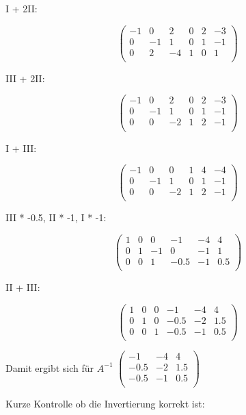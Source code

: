 \documentclass{article}
\begin{document}
I + 2II:

\[
\left (
\begin{array}{ccc|ccc}
  -1 & 0 & 2 & 0 & 2 & -3 \\
  0 & -1 & 1 & 0 & 1 & -1 \\
  0 & 2 & -4 & 1 & 0 & 1 \\
\end{array}
\right )
\]

III + 2II:

\[
\left (
\begin{array}{ccc|ccc}
  -1 & 0 & 2 & 0 & 2 & -3 \\
  0 & -1 & 1 & 0 & 1 & -1 \\
  0 & 0 & -2 & 1 & 2 & -1 \\
\end{array}
\right )
\]

I + III:

\[
\left (
\begin{array}{ccc|ccc}
  -1 & 0 & 0 & 1 & 4 & -4 \\
  0 & -1 & 1 & 0 & 1 & -1 \\
  0 & 0 & -2 & 1 & 2 & -1 \\
\end{array}
\right )
\]

III * -0.5, II * -1, I * -1:

\[
\left (
\begin{array}{ccc|ccc}
  1 & 0 & 0 & -1 & -4 & 4 \\
  0 & 1 & -1 & 0 & -1 & 1 \\
  0 & 0 & 1 & -0.5 & -1 & 0.5 \\
\end{array}
\right )
\]

II + III:

\[
\left (
\begin{array}{ccc|ccc}
  1 & 0 & 0 & -1 & -4 & 4 \\
  0 & 1 & 0 & -0.5 & -2 & 1.5 \\
  0 & 0 & 1 & -0.5 & -1 & 0.5 \\
\end{array}
\right )
\]

Damit ergibt sich für \(A^{-1}\)
\(
\begin{pmatrix}
  -1 & -4 & 4 \\
  -0.5 & -2 & 1.5 \\
  -0.5 & -1 & 0.5 \\
\end{pmatrix}
\)

Kurze Kontrolle ob die Invertierung korrekt ist:
\end{document}
